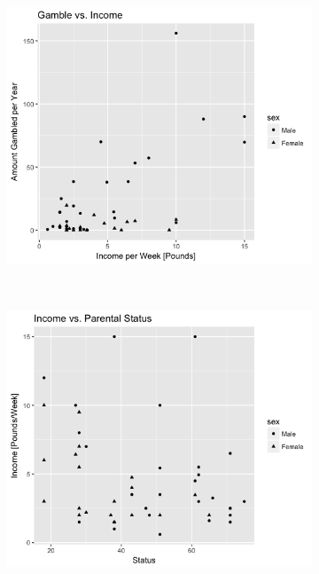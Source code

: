 \documentclass{exam}
\begin{document}
\begin{figure}[t!]
	\centering
	\begin{subfigure}
		\centering
		\includegraphics[scale = .7]{Gamble_V_income}		
	\end{subfigure}%
	~ 
	\begin{subfigure}
		\centering
		\includegraphics[scale=0.7]{Income_V_status}
	\end{subfigure}
\end{figure}
\end{document}
